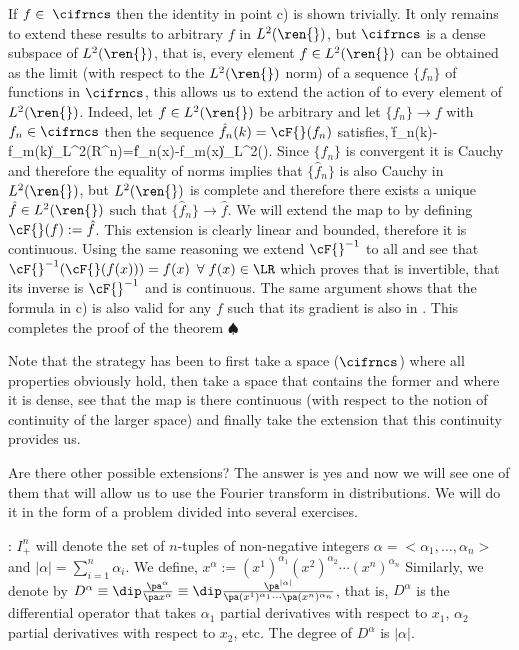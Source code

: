If $f\in\;\cifrncs$ then the identity in point c) is shown trivially. 
%
It only remains to extend these results to arbitrary $f$ in $L^2(\ren{})$,
but $\cifrncs$ is a dense subspace of $L^2(\ren{})$, that is, every element 
$f\in L^2(\ren{})$
can be obtained as the limit (with respect to the $L^2(\ren{})$ norm) of a 
sequence $\{f_n\}$ of functions in $\cifrncs$, this allows us to extend the
action of \cF{} to every element of $L^2(\ren{})$. 
Indeed, let $f\in L^2(\ren{})$ be arbitrary and
let $\{f_n\}\to f $ with $f_n \in\cifrncs$ then the sequence $\hat f_n(k)=\cF{}(f_n)$ 
satisfies,
\beq
\|\hat f_n(k)-\hat f_m(k)\|_{L^2(R^n)}=\|f_n(x)-f_m(x)\|_{L^2(\ren{})}.
\eeq
Since $\{f_n\}$ is convergent it is Cauchy and therefore the equality of norms 
implies that $\{\hat f_n\}$ is also
Cauchy in $L^2(\ren{})$, but $L^2(\ren{})$ is complete and therefore there exists a unique
$\hat f\in L^2(\ren{})$ such that $\{\hat f_n\}\to\hat f$.
We will extend the map \cF{} to \LR{} by defining $\cF{}(f) := \hat f$.
This extension is clearly linear and bounded, therefore it is
continuous. 
Using the same reasoning we extend $\cF{}^{-1}$ to all \LR{} and
see that $\cF{}^{-1}(\cF{}(f(x)))=f(x)$ $ \forall\;f(x)\in\LR$ 
which proves that \cF{} is invertible, that its inverse is
$\cF{}^{-1}$ and is continuous. The same argument shows that the formula in c)
is also valid for any $f$ such that its gradient is also
in \LR{}. This completes the proof of the theorem $\spadesuit$

Note that the strategy has been to first take a space ($\cifrncs$) where
all properties obviously hold, then take a space that
contains the former and where it is dense, see that the map is there
continuous (with respect to the notion of continuity of the larger
space) and finally take the extension that this continuity provides us.

Are there other possible extensions? The answer is yes and now we will see
one of them that will allow us to use the Fourier transform in
distributions. We will do it in the form of a problem divided into several
exercises.

\espa
\noi
{}: $I_+^n$ will denote the set of $n$-tuples of
non-negative integers 
$\alpha=<\alpha_1,\ldots,\alpha_n>$ 
and 
$|\alpha|=\sum_{i=1}^n\alpha_i$.
We define,  $x^{\alpha} := (x^1)^{\alpha_1} (x^2)^{\alpha_2} \cdots (x^n)^{\alpha_n}$
Similarly, we denote by 
$D^{\alpha}\equiv\dip\frac{\pa^{\alpha}}{\pa x^{\alpha}}\equiv\dip\frac{\pa^{|\alpha|}}
 {\pa (x^1)^{\alpha_1}\cdots\pa (x^n)^{\alpha_n}}$, 
 that is, $D^{\alpha}$ is the differential operator that takes $\alpha_1$ partial derivatives with respect to $x_1$, $\alpha_2$ partial derivatives with respect to $x_2$, etc. The degree of $D^{\alpha}$ is $|\alpha|$.


